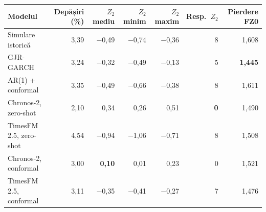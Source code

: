 \begin{tabular}{lrrrrrr}
\toprule
Modelul & Depășiri (\%) & $Z_2$ mediu & $Z_2$ minim & $Z_2$ maxim & Resp.\ $Z_2$ & Pierdere FZ0 \\
\midrule
Simulare istorică & 3,39 & $-$0,49 & $-$0,74 & $-$0,36 & 8 & 1,608 \\
GJR-GARCH & 3,24 & $-$0,32 & $-$0,49 & $-$0,13 & 5 & \textbf{1,445} \\
AR(1) + conformal & 3,35 & $-$0,49 & $-$0,66 & $-$0,38 & 8 & 1,611 \\
Chronos-2, zero-shot & 2,10 & 0,34 & 0,26 & 0,51 & \textbf{0} & 1,490 \\
TimesFM 2.5, zero-shot & 4,54 & $-$0,94 & $-$1,06 & $-$0,71 & 8 & 1,508 \\
Chronos-2, conformal & 3,00 & \textbf{0,10} & 0,01 & 0,23 & 0 & 1,521 \\
TimesFM 2.5, conformal & 3,11 & $-$0,35 & $-$0,41 & $-$0,27 & 7 & 1,476 \\
\bottomrule
\end{tabular}

